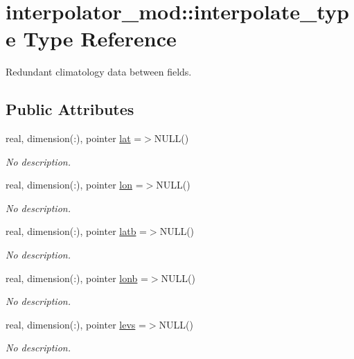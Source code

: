\hypertarget{structinterpolator__mod_1_1interpolate__type}{}\section{interpolator\+\_\+mod\+:\+:interpolate\+\_\+type Type Reference}
\label{structinterpolator__mod_1_1interpolate__type}


Redundant climatology data between fields.  


\subsection*{Public Attributes}
\begin{DoxyCompactItemize}
\item 
real, dimension(\+:), pointer \hyperlink{structinterpolator__mod_1_1interpolate__type_a6c09c87fb6fa9738a5f6a960f08c7ab5}{lat} =$>$N\+U\+LL()
\begin{DoxyCompactList}\small\item\em No description. \end{DoxyCompactList}\item 
real, dimension(\+:), pointer \hyperlink{structinterpolator__mod_1_1interpolate__type_aa199d288af9a7662eec0aa306b1a2e53}{lon} =$>$N\+U\+LL()
\begin{DoxyCompactList}\small\item\em No description. \end{DoxyCompactList}\item 
real, dimension(\+:), pointer \hyperlink{structinterpolator__mod_1_1interpolate__type_a4fda8f1922dd8709fa3a7df4a20a16e8}{latb} =$>$N\+U\+LL()
\begin{DoxyCompactList}\small\item\em No description. \end{DoxyCompactList}\item 
real, dimension(\+:), pointer \hyperlink{structinterpolator__mod_1_1interpolate__type_aa3e56228c9f9a0a8fc27048b98769b04}{lonb} =$>$N\+U\+LL()
\begin{DoxyCompactList}\small\item\em No description. \end{DoxyCompactList}\item 
real, dimension(\+:), pointer \hyperlink{structinterpolator__mod_1_1interpolate__type_a0b204dd7555282e3d37f14e10ba6dada}{levs} =$>$N\+U\+LL()
\begin{DoxyCompactList}\small\item\em No description. \end{DoxyCompactList}\item 

\end{DoxyCompactItemize}
